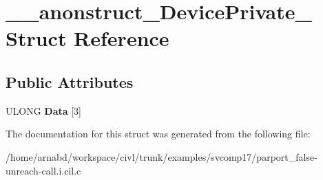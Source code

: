 \hypertarget{struct____anonstruct__DevicePrivate__21}{}\section{\+\_\+\+\_\+anonstruct\+\_\+\+Device\+Private\+\_ Struct Reference}
\label{struct____anonstruct__DevicePrivate__21}
\subsection*{Public Attributes}
\begin{DoxyCompactItemize}
\item 
\hypertarget{struct____anonstruct__DevicePrivate__21_a90064e537efa6cf332b042efc872f470}{}U\+L\+O\+N\+G {\bfseries Data} \mbox{[}3\mbox{]}\label{struct____anonstruct__DevicePrivate__21_a90064e537efa6cf332b042efc872f470}

\end{DoxyCompactItemize}


The documentation for this struct was generated from the following file\+:\begin{DoxyCompactItemize}
\item 
/home/arnabd/workspace/civl/trunk/examples/svcomp17/parport\+\_\+false-\/unreach-\/call.\+i.\+cil.\+c\end{DoxyCompactItemize}
